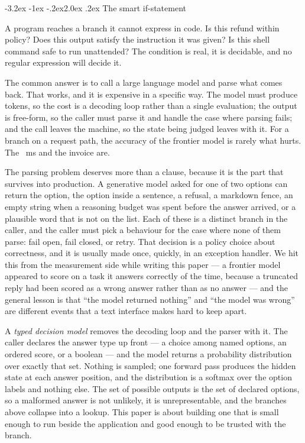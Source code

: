 \documentclass[11pt]{article}
\makeatletter
\renewcommand\section{\@startsection{section}{1}{\z@}%
  {-3.2ex \@plus -1ex \@minus -.2ex}{2.0ex \@plus.2ex}%
  {\normalfont\large\bfseries\color{accent}}}
\newcommand{\1}{\mathbf{1}}
\makeatother
\begin{document}
\section{The smart if-statement}

A program reaches a branch it cannot express in code. Is this refund within policy? Does this output
satisfy the instruction it was given? Is this shell command safe to run unattended? The condition is
real, it is decidable, and no regular expression will decide it.

The common answer is to call a large language model and parse what comes back. That works, and it is
expensive in a specific way. The model must produce tokens, so the cost is a decoding loop rather
than a single evaluation; the output is free-form, so the caller must parse it and handle the case
where parsing fails; and the call leaves the machine, so the state being judged leaves with it. For a
branch on a request path, the accuracy of the frontier model is rarely what hurts. The
\apiclaudeopusfiveMs{}~ms and the invoice are.

The parsing problem deserves more than a clause, because it is the part that survives into
production. A generative model asked for one of two options can return the option, the option
inside a sentence, a refusal, a markdown fence, an empty string when a reasoning budget was spent
before the answer arrived, or a plausible word that is not on the list. Each of these is a distinct
branch in the caller, and the caller must pick a behaviour for the case where none of them parse:
fail open, fail closed, or retry. That decision is a policy choice about correctness, and it is
usually made once, quickly, in an exception handler. We hit this from the measurement side while
writing this paper --- a frontier model appeared to score \truncBadAcc{} on a task it answers
correctly \truncGoodAcc{} of the time, because a truncated reply had been scored as a wrong answer
rather than as no answer --- and the general lesson is that ``the model returned nothing'' and
``the model was wrong'' are different events that a text interface makes hard to keep apart.

A \emph{typed decision model} removes the decoding loop and the parser with it. The caller declares
the answer type up front --- a choice among named options, an ordered score, or a boolean --- and
the model returns a probability distribution over exactly that set. Nothing is sampled; one forward
pass produces the hidden state at each answer position, and the distribution is a softmax over the
option labels and nothing else. The set of possible outputs is the set of declared options, so a
malformed answer is not unlikely, it is unrepresentable, and the branches above collapse into a
lookup. This paper is about building one that is small enough to run beside the application and
good enough to be trusted with the branch.
\end{document}

